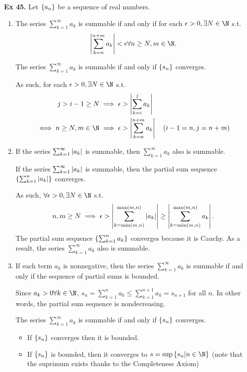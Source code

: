 \noindent {} \textbf{Ex 45.} \label{ex:45}
Let $\left\{a_n\right\}$ be a sequence of real numbers.
\begin{enumerate}[label=(\roman*)]
    \item The series $\sum_{k=1}^\infty a_k$ is summable if and only if for each $\epsilon > 0, \exists N\in\N$ s.t.
    \[ \abs{\sum_{k=n}^{n+m} a_k} < \epsilon \forall n \geq N, m \in \N.\]
    
    The series $\sum_{k=1}^{\infty} a_k$ is summable if and only if $\left\{s_n\right\}$ converges.

    As such, for each $\epsilon > 0, \exists N \in \N$ s.t.
    \begin{align*}
        j > i-1 \geq N &\implies \epsilon > \abs{\sum_{k=i}^{j} a_k} \\
        \iff n \geq N, m \in \N &\implies \epsilon > \abs{\sum_{k=n}^{n+m} a_k} \quad (i-1 = n, j = n+m)
    \end{align*}
    
    \item If the series $\sum_{k=1}^\infty \left|a_k\right|$ is summable, then $\sum_{k=1}^\infty a_k$ also is summable.

    If the series $\sum_{k=1}^\infty \left|a_k\right|$ is summable, then the partial sum sequence $\left\{\sum_{k=1}^{n} \left|a_k\right|\right\}$ converges.
    
    As such, $\forall \epsilon > 0, \exists N \in\N$ s.t.
    \[ n,m \geq N \implies \epsilon > \left|\sum_{k=\min(m,n)}^{\max(m,n)} \left|a_k\right|\right| \geq \left|\sum_{k=\min(m,n)}^{\max(m,n)} a_k\right|. \]
    The partial sum sequence $\left\{\sum_{k=1}^{n} a_k\right\}$ converges because it is Cauchy. As a result, the series $\sum_{k=1}^\infty a_k$ also is summable.

    \item If each term $a_k$ is nonnegative, then the series $\sum_{k=1}^\infty a_k$ is summable if and only if the sequence of partial sums is bounded.
    
    Since $a_k > 0 \forall k\in\N$, $s_n = \sum_{k=1}^{n} a_k \leq \sum_{k=1}^{n+1} a_k = s_{n+1}$ for all $n$. In other words, the partial sum sequence is nondecreasing.

    The series $\sum_{k=1}^{\infty} a_k$ is summable if and only if $\left\{s_n\right\}$ converges.
    \begin{itemize}
        \item If $\left\{s_n\right\}$ converges then it is bounded.
        \item If $\left\{s_n\right\}$ is bounded, then it converges to $s = \sup\seq{s_n | n \in \N}$ (note that the suprimum exists thanks to the Completeness Axiom)
        

\end{itemize}
\end{enumerate}

